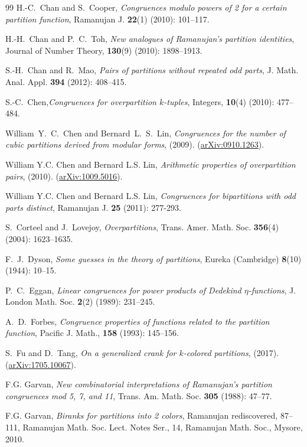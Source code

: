 \documentclass[12pt]{amsart}
\numberwithin{equation}{section}
\theoremstyle{plain}
\theoremstyle{definition}
\begin{document}
\begin{thebibliography}{99}
H.-C.~Chan and S.~Cooper, \emph{Congruences modulo powers of 2 for a certain partition function}, Ramanujan J. \textbf{22}(1) (2010): 101--117.

H.-H.~Chan and P.~C.~Toh, \emph{New analogues of Ramanujan's partition identities}, Journal of Number Theory, {\bf 130}(9) (2010): 1898--1913.

S.-H.~Chan and R.~Mao, \emph{Pairs of partitions without repeated odd parts}, J. Math. Anal. Appl. \textbf{394} (2012): 408--415.

S.-C.~Chen,\emph{Congruences for overpartition $k$-tuples}, Integers, {\bf 10}(4) (2010): 477--484.

William~Y.~C.~Chen and Bernard~L.~S.~Lin, \emph{Congruences for the number of cubic partitions derived from modular forms}, (2009). (\href{http://arxiv.org/abs/0910.1263}{arXiv:0910.1263}).

William Y.C. Chen and Bernard L.S. Lin, \emph{Arithmetic properties of overpartition pairs}, (2010). (\href{http://arxiv.org/abs/1009.5016}{arXiv:1009.5016}).

William Y.C. Chen and Bernard L.S. Lin, \emph{Congruences for bipartitions with odd parts distinct}, Ramanujan J. \textbf{25} (2011): 277-293.

S.~Corteel and J.~Lovejoy, \emph{Overpartitions}, Trans. Amer. Math. Soc. {\bf 356}(4) (2004): 1623--1635.

F.~J.~Dyson, \emph{Some guesses in the theory of partitions}, Eureka (Cambridge) {\bf 8}(10) (1944): 10--15.

P.~C.~Eggan, \emph{Linear congruences for power products of Dedekind $\eta$-functions}, J. London Math. Soc. {\bf 2}(2) (1989): 231--245.

A.~D.~Forbes, \emph{Congruence properties of functions related to the partition function}, Pacific J. Math., {\bf 158} (1993): 145--156.

S.~Fu and D.~Tang, \emph{On a generalized crank for $k$-colored partitions}, (2017). (\href{http://arxiv.org/abs/1705.10067}{arXiv:1705.10067}).

F.G. Garvan, \emph{New combinatorial interpretations of Ramanujan's partition congruences mod 5, 7, and 11}, Trans. Am. Math. Soc. \textbf{305} (1988): 47--77.

F.G. Garvan, \emph{Biranks for partitions into 2 colors}, Ramanujan rediscovered, 87--111, Ramanujan Math. Soc. Lect. Notes Ser., 14, Ramanujan Math. Soc., Mysore, 2010.


\end{thebibliography}
\end{document}
